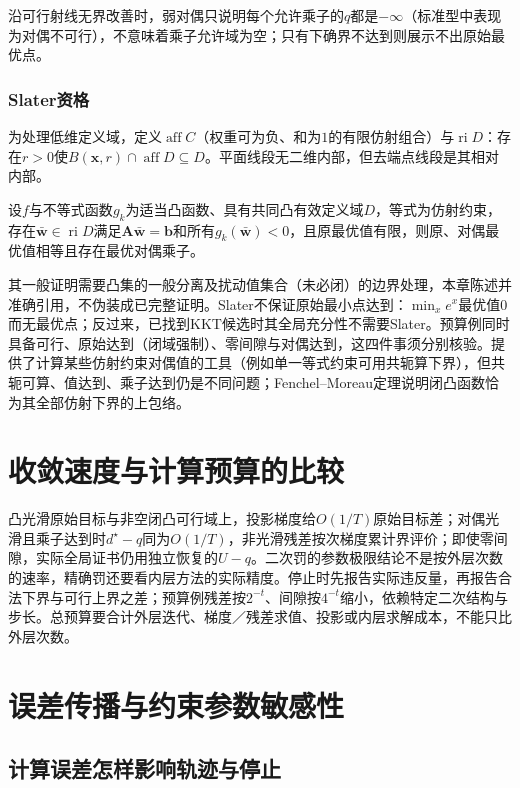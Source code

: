 沿可行射线无界改善时，弱对偶只说明每个允许乘子的$q$都是$-\infty$（标准型中表现为对偶不可行），不意味着乘子允许域为空；只有下确界不达到则展示不出原始最优点。

\subsubsection{Slater资格}

为处理低维定义域，定义$\operatorname{aff}C$（权重可为负、和为$1$的有限仿射组合）与$\operatorname{ri}D$：存在$r>0$使$B(\bm x,r)\cap\operatorname{aff}D\subseteq D$。平面线段无二维内部，但去端点线段是其相对内部。

\begin{theorem}[Slater条件下的强对偶]
设$f$与不等式函数$g_k$为适当凸函数、具有共同凸有效定义域$D$，等式为仿射约束，存在$\bar{\bm w}\in\operatorname{ri}D$满足$\bm A\bar{\bm w}=\bm b$和所有$g_k(\bar{\bm w})<0$，且原最优值有限，则原、对偶最优值相等且存在最优对偶乘子。
\end{theorem}

其一般证明需要凸集的一般分离及扰动值集合（未必闭）的边界处理，本章陈述并准确引用，不伪装成已完整证明。Slater不保证原始最小点达到：$\min_x e^x$最优值$0$而无最优点；反过来，已找到KKT候选时其全局充分性不需要Slater。预算例同时具备可行、原始达到（闭域强制）、零间隙与对偶达到，这四件事须分别核验。提供了计算某些仿射约束对偶值的工具（例如单一等式约束可用共轭算下界），但共轭可算、值达到、乘子达到仍是不同问题；Fenchel--Moreau定理说明闭凸函数恰为其全部仿射下界的上包络。

\section{收敛速度与计算预算的比较}

凸光滑原始目标与非空闭凸可行域上，投影梯度给$O(1/T)$原始目标差；对偶光滑且乘子达到时$d^\star-q$同为$O(1/T)$，非光滑残差按次梯度累计界评价；即使零间隙，实际全局证书仍用独立恢复的$U-q$。二次罚的参数极限结论不是按外层次数的速率，精确罚还要看内层方法的实际精度。停止时先报告实际违反量，再报告合法下界与可行上界之差；预算例残差按$2^{-t}$、间隙按$4^{-t}$缩小，依赖特定二次结构与步长。总预算要合计外层迭代、梯度／残差求值、投影或内层求解成本，不能只比外层次数。

\section{误差传播与约束参数敏感性}

\subsection{计算误差怎样影响轨迹与停止}

